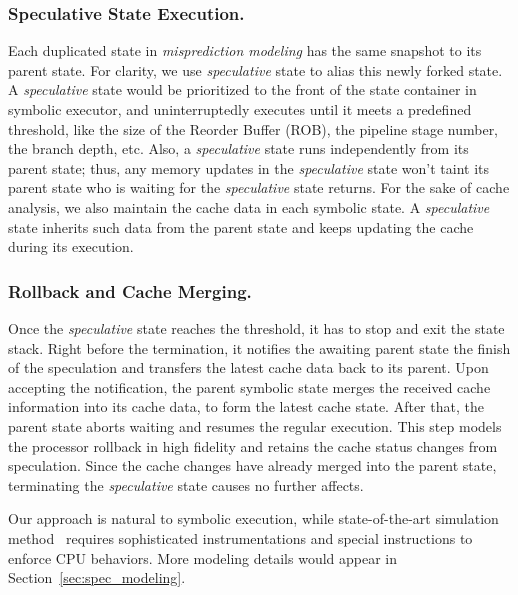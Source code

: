 \documentclass[sigconf]{acmart}
\newcommand\ignore[1]{}
\begin{document}
\subsubsection{Speculative State Execution.}
Each duplicated state in \textit{misprediction modeling} has the same snapshot to 
its parent state. For clarity, we use \textit{speculative} state to alias this newly
forked state. A \textit{speculative} state would be prioritized to the front of the 
state container in symbolic executor, and uninterruptedly executes until it meets a 
predefined threshold, like the size of the Reorder Buffer (ROB), the pipeline stage 
number, the branch depth, etc. Also, a \textit{speculative} state runs independently 
from its parent state; thus, any memory updates in the \textit{speculative} state 
won't taint its parent state who is waiting for the \textit{speculative} state returns. 
For the sake of cache analysis, we also maintain the cache data in each symbolic state. 
A \textit{speculative} state inherits such data from the parent state and keeps updating 
the cache during its execution.


\subsubsection{Rollback and Cache Merging.}
Once the \textit{speculative} state reaches the threshold, it has to stop and exit the 
state stack. Right before the termination, it notifies the awaiting parent state the 
finish of the speculation and transfers the latest cache data back to its parent. Upon 
accepting the notification, the parent symbolic state merges the received cache information
into its cache data, to form the latest cache state. After that, the parent state aborts 
waiting and resumes the regular execution. This step models the processor rollback in 
high fidelity and retains the cache status changes from speculation. Since the cache 
changes have already merged into the parent state, terminating the \textit{speculative} 
state causes no further affects.  


Our approach is natural to symbolic execution, while state-of-the-art simulation 
method~\cite{OleksenkoTSF19} requires sophisticated instrumentations and special 
instructions to enforce CPU behaviors. More modeling details would appear in 
Section~\ref{sec:spec_modeling}.


\ignore{
Our modeling approach is sound and elegant. Focusing on the worst 
case predication, we avoid missing any speculated branch that may 
cause leaks. 
}
\end{document}
